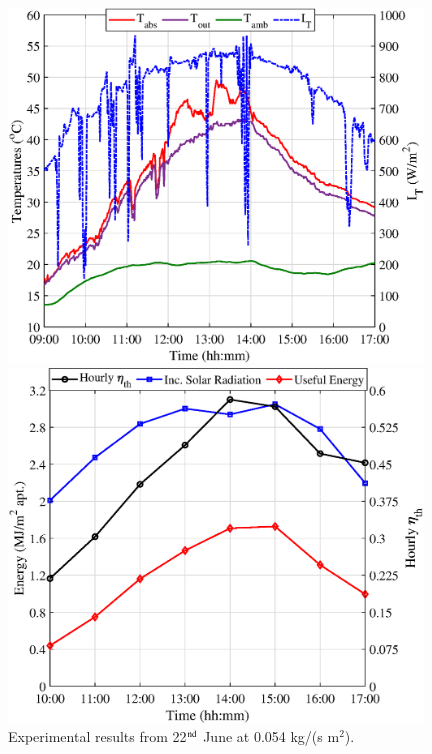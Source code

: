 \begin{figure}[!ht]
	\centering
	\begin{minipage}{0.49\textwidth}
		\centering
		\includegraphics[width=0.98\textwidth]{figs/0055-1.eps} %
	\end{minipage}\hfill
	\begin{minipage}{0.49\textwidth}
		\centering
		\includegraphics[width=0.98\textwidth]{figs/0055-2.eps} %
	\end{minipage}
	
	\caption{Experimental results from 22$^{\rm{nd}}$ June at 0.054 kg/(s m$^2$).}
	\label{0055}
\end{figure}

